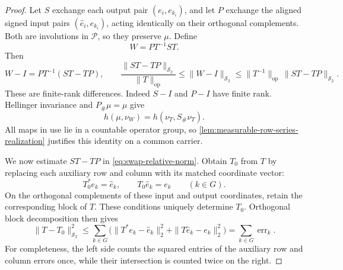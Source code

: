 \begin{proof}
Let $S$ exchange each output pair $(e_i,e_{k_i})$, and let $P$ exchange
the aligned signed input pairs $(\widehat e_i,\widehat e_{k_i})$, acting
identically on their orthogonal complements.  Both are involutions in
$\mathcal P$, so they preserve $\mu$.  Define
\[
 W=P T^{-1} S T.
\]
Then
\begin{equation}
 W-I=P T^{-1}(ST-TP),\qquad
 \frac{\|ST-TP\|_{\mathcal S_2}}{\|T\|_{\mathrm{op}}}
 \leq\|W-I\|_{\mathcal S_2}
 \leq\|T^{-1}\|_{\mathrm{op}}\,\|ST-TP\|_{\mathcal S_2}.
 \label{eq:swap-relative-norm}
\end{equation}
These are finite-rank differences.
Indeed $S-I$ and $P-I$ have finite rank.
Hellinger invariance and $P_\#\mu=\mu$ give
\begin{equation}
 h(\mu,\nu_W)=h(\nu_T,S_\#\nu_T).
 \label{eq:swap-hellinger-identity}
\end{equation}
All maps in use lie in a countable operator group, so
\cref{lem:measurable-row-series-realization} justifies this identity on a common
carrier.

We now estimate $ST-TP$ in \eqref{eq:swap-relative-norm}.
Obtain $T_0$ from $T$ by replacing each auxiliary row and column with
its matched coordinate vector:
\[
 T_0^*e_k=\widehat e_k,\qquad T_0\widehat e_k=e_k\qquad(k\in G).
\]
On the orthogonal complements of these input and output coordinates,
retain the corresponding block of $T$.  These conditions uniquely
determine $T_0$.
Orthogonal block decomposition then gives
\begin{equation}
 \|T-T_0\|_{\mathcal S_2}^2
 \leq\sum_{k\in G}
       \bigl(\|T^*e_k-\widehat e_k\|_2^2
                    +\|T\widehat e_k-e_k\|_2^2\bigr)
 =\sum_{k\in G}\operatorname{err}_k.
 \label{eq:auxiliary-coordinate-approximation}
\end{equation}
For completeness, the left side counts the squared entries of the
auxiliary row and column errors once, while their intersection is
counted twice on the right.


\end{proof}
